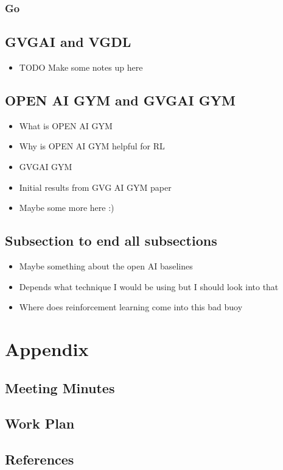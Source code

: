 \documentclass[a4paper]{article}
\begin{document}
\subsubsection{Go}


\subsection{GVGAI and VGDL}
\begin{itemize}
    \item TODO Make some notes up here
\end{itemize}
\subsection{OPEN AI GYM and GVGAI GYM}
\begin{itemize}
    \item What is OPEN AI GYM
    \item Why is OPEN AI GYM helpful for RL
    \item GVGAI GYM
    \item Initial results from GVG AI GYM paper
    \item Maybe some more here :)
\end{itemize}
\cite{GVGAIGYM}
\subsection{Subsection to end all subsections}
\begin{itemize}
    \item Maybe something about the open AI baselines
    \item Depends what technique I would be using but I should look into that
    \item Where does reinforcement learning come into this bad buoy
\end{itemize}


\pagebreak
\section{Appendix}

\subsection{Meeting Minutes}


\pagebreak
\subsection{Work Plan}


\subsection{References}


\end{document}
